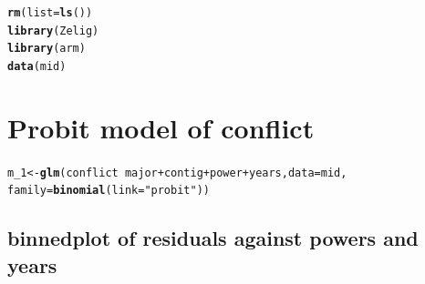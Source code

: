 \documentclass{article}\usepackage[]{graphicx}\usepackage[]{color}
\makeatletter
\newcommand{\hlstr}[1]{\textcolor[rgb]{0.192,0.494,0.8}{#1}}%
\newcommand{\hlopt}[1]{\textcolor[rgb]{0,0,0}{#1}}%
\newcommand{\hlstd}[1]{\textcolor[rgb]{0.345,0.345,0.345}{#1}}%
\newcommand{\hlkwb}[1]{\textcolor[rgb]{0.69,0.353,0.396}{#1}}%
\newcommand{\hlkwc}[1]{\textcolor[rgb]{0.333,0.667,0.333}{#1}}%
\newcommand{\hlkwd}[1]{\textcolor[rgb]{0.737,0.353,0.396}{\textbf{#1}}}%
\newenvironment{kframe}{%
 \def\at@end@of@kframe{}%
 \ifinner\ifhmode%
  \def\at@end@of@kframe{\end{minipage}}%
  \begin{minipage}{\columnwidth}%
 \fi\fi%
 \def\FrameCommand##1{\hskip\@totalleftmargin \hskip-\fboxsep
 \colorbox{shadecolor}{##1}\hskip-\fboxsep
     \hskip-\linewidth \hskip-\@totalleftmargin \hskip\columnwidth}%
 \MakeFramed {\advance\hsize-\width
   \@totalleftmargin\z@ \linewidth\hsize
   \@setminipage}}%
 {\par\unskip\endMakeFramed%
 \at@end@of@kframe}
\newenvironment{knitrout}{}{} %
\makeatother
\begin{document}
\begin{knitrout}
\color{fgcolor}\begin{kframe}
\begin{alltt}
\hlkwd{rm}\hlstd{(}\hlkwc{list} \hlstd{=} \hlkwd{ls}\hlstd{())}
\hlkwd{library}\hlstd{(Zelig)}
\hlkwd{library}\hlstd{(arm)}
\hlkwd{data}\hlstd{(mid)}
\end{alltt}
\end{kframe}
\end{knitrout}

\section{Probit model of conflict}

\begin{knitrout}
\color{fgcolor}\begin{kframe}
\begin{alltt}
\hlstd{m_1} \hlkwb{<-} \hlkwd{glm}\hlstd{(conflict} \hlopt{~} \hlstd{major} \hlopt{+} \hlstd{contig} \hlopt{+} \hlstd{power} \hlopt{+} \hlstd{years,} \hlkwc{data} \hlstd{= mid,}
           \hlkwc{family} \hlstd{=} \hlkwd{binomial}\hlstd{(}\hlkwc{link} \hlstd{=} \hlstr{"probit"}\hlstd{))}
\end{alltt}
\end{kframe}
\end{knitrout}

\subsection{binnedplot of residuals against powers and years}
\end{document}
